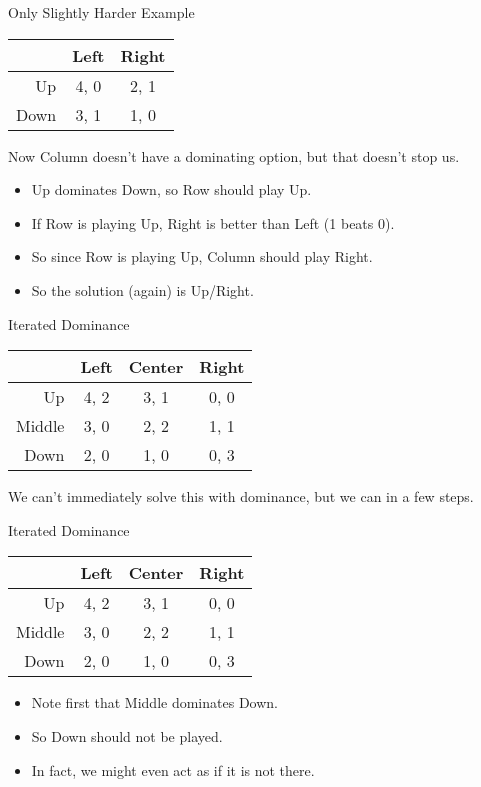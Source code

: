 \documentclass[
  ignorenonframetext,
]{beamer}
\providecommand{\tightlist}{%
  \setlength{\itemsep}{0pt}\setlength{\parskip}{0pt}}
\begin{document}
\begin{frame}{Only Slightly Harder Example}
\protect\hypertarget{only-slightly-harder-example}{}
\begin{table}[!h]
\centering
\begin{tabular}[t]{>{}r|cc}
\toprule
 & Left & Right\\
\midrule
Up & 4, 0 & 2, 1\\
Down & 3, 1 & 1, 0\\
\bottomrule
\end{tabular}
\end{table}

Now Column doesn't have a dominating option, but that doesn't stop us.

\begin{itemize}[<+->]
\tightlist
\item
  Up dominates Down, so Row should play Up.
\item
  If Row is playing Up, Right is better than Left (1 beats 0).
\item
  So since Row is playing Up, Column should play Right.
\item
  So the solution (again) is Up/Right.
\end{itemize}
\end{frame}

\begin{frame}{Iterated Dominance}
\protect\hypertarget{iterated-dominance}{}
\begin{table}[!h]
\centering
\begin{tabular}[t]{>{}r|ccc}
\toprule
 & Left & Center & Right\\
\midrule
Up & 4, 2 & 3, 1 & 0, 0\\
Middle & 3, 0 & 2, 2 & 1, 1\\
Down & 2, 0 & 1, 0 & 0, 3\\
\bottomrule
\end{tabular}
\end{table}

We can't immediately solve this with dominance, but we can in a few
steps.
\end{frame}

\begin{frame}{Iterated Dominance}
\protect\hypertarget{iterated-dominance-1}{}
\begin{table}[!h]
\centering
\begin{tabular}[t]{>{}r|ccc}
\toprule
 & Left & Center & Right\\
\midrule
Up & 4, 2 & 3, 1 & 0, 0\\
Middle & 3, 0 & 2, 2 & 1, 1\\
Down & 2, 0 & 1, 0 & 0, 3\\
\bottomrule
\end{tabular}
\end{table}

\begin{itemize}
\tightlist
\item
  Note first that Middle dominates Down.
\item
  So Down should not be played.
\item
  In fact, we might even act as if it is not there.
\end{itemize}
\end{frame}
\end{document}
